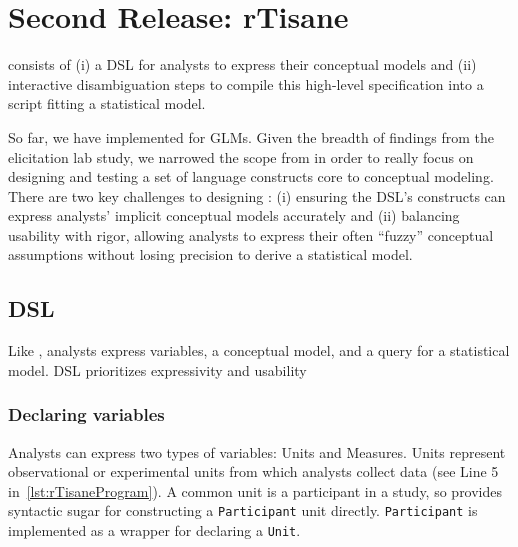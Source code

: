 \section{Second Release: rTisane} \label{sec:rTisane}

\rTisane consists of (i) a DSL for analysts to express their conceptual
models and (ii) interactive disambiguation steps to compile this high-level specification into a
script fitting a statistical model. 

So far, we have implemented \rTisane for GLMs. Given the breadth of findings
from the elicitation lab study, we narrowed the scope from \tisane in order to
really focus on designing and testing a set of language constructs core to
conceptual modeling. 
There are two key challenges to designing \rTisane: (i) ensuring the DSL's
constructs can express analysts' implicit conceptual models accurately and (ii) %
balancing usability with rigor, allowing
analysts to express their often ``fuzzy'' conceptual assumptions without losing
precision to derive a statistical model.


\rTisaneProgram
{}

\def\Participant{\texttt{Participant}\xspace}
\def\Unit{\texttt{Unit}\xspace}
\def\Condition{\texttt{Condition}\xspace}
\def\Conditions{\texttt{Condition}s\xspace}

\subsection{\rTisanes DSL}
Like \tisane, analysts express variables, a conceptual model, and a query for a
statistical model. \rTisanes DSL prioritizes expressivity and usability 

\subsubsection{Declaring variables}
Analysts can express two types of variables: Units and Measures. Units represent
observational or experimental units from which analysts collect data (see Line 5 in~\autoref{lst:rTisaneProgram}). 
A common unit is a participant in a study, so \rTisane provides syntactic sugar for
constructing a \Participant unit directly. \Participant is implemented as a wrapper for
declaring a \Unit.

